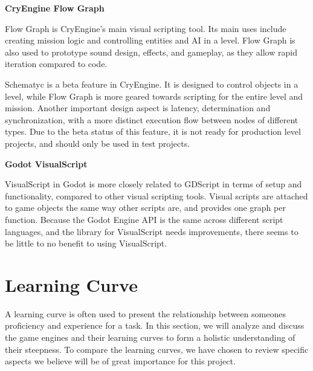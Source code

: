 \textbf{CryEngine Flow Graph} \label{cryengine:flow_graph}

Flow Graph is CryEngine's main visual scripting tool. Its main uses include creating mission logic and controlling entities and AI in a level. Flow Graph is also used to prototype sound design, effects, and gameplay, as they allow rapid iteration compared to code. 

Schematyc is a beta feature in CryEngine. It is designed to control objects in a level, while Flow Graph is more geared towards scripting for the entire level and mission. Another important design aspect is latency, determination and synchronization, with a more distinct execution flow between nodes of different types. Due to the beta status of this feature, it is not ready for production level projects, and should only be used in test projects. \cite{cryengine_schematyc}

\textbf{Godot VisualScript} \label{godot:visualscript}

VisualScript in Godot is more closely related to GDScript in terms of setup and functionality, compared to other visual scripting tools. Visual scripts are attached to game objects the same way other scripts are, and provides one graph per function. \cite{godot_visual_script_tutorial} Because the Godot Engine API is the same across different script languages, and the library for VisualScript needs improvements, there seems to be little to no benefit to using VisualScript.



\section{Learning Curve}

A learning curve is often used to present the relationship between someones proficiency and experience for a task. In this section, we will analyze and discuss the game engines and their learning curves to form a holistic understanding of their steepness. To compare the learning curves, we have chosen to review specific aspects we believe will be of great importance for this project.


